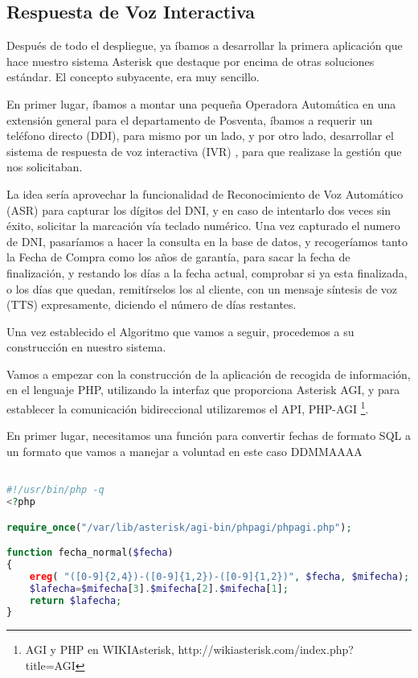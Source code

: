\color[rgb]{0,0,0}

\newpage

\subsection{Respuesta de Voz Interactiva}

Después de todo el despliegue, ya íbamos a desarrollar la primera aplicación que hace nuestro sistema Asterisk que destaque por encima de otras soluciones estándar. El concepto subyacente, era muy sencillo.

En primer lugar, íbamos a montar una pequeña Operadora Automática en una extensión general para el departamento de Posventa, íbamos a requerir un teléfono directo (DDI), para mismo por un lado, y por otro lado, desarrollar el sistema de respuesta de voz interactiva (IVR) \cite{website:ivr}, para que realizase la gestión que nos solicitaban.

La idea sería aprovechar la funcionalidad de Reconocimiento de Voz Automático (ASR) para capturar los dígitos del DNI, y en caso de intentarlo dos veces sin éxito, solicitar la marcación vía teclado numérico. Una vez capturado el numero de DNI, pasaríamos a hacer la consulta en la base de datos, y recogeríamos tanto la Fecha de Compra como los años de garantía, para sacar la fecha de finalización, y restando los días a la fecha actual, comprobar si ya esta finalizada, o los días que quedan, remitírselos los al cliente, con un mensaje síntesis de voz (TTS) expresamente, diciendo el número de días restantes.

Una vez establecido el Algoritmo que vamos a seguir, procedemos a su construcción en nuestro sistema.

Vamos a empezar con la construcción de la aplicación de recogida de información, en el lenguaje PHP, utilizando la interfaz que proporciona Asterisk AGI, y para establecer la comunicación bidireccional utilizaremos el API, PHP-AGI \footnote{AGI y PHP en WIKIAsterisk, http://wikiasterisk.com/index.php?title=AGI}.

En primer lugar, necesitamos una función para convertir fechas de formato SQL a un formato que vamos a manejar a voluntad en este caso DDMMAAAA

\begin{lstlisting}[language=php,title={/var/lib/asterisk/agi-bin/fingarantia.php}]

#!/usr/bin/php -q
<?php

require_once("/var/lib/asterisk/agi-bin/phpagi/phpagi.php");

function fecha_normal($fecha)
{
    ereg( "([0-9]{2,4})-([0-9]{1,2})-([0-9]{1,2})", $fecha, $mifecha);
    $lafecha=$mifecha[3].$mifecha[2].$mifecha[1];
    return $lafecha;
}

\end{lstlisting}

